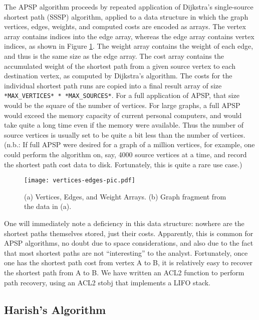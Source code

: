 \documentclass[copyright]{eptcs}
\begin{document}
The APSP algorithm proceeds by repeated application of Dijkstra's
single-source shortest path (SSSP) algorithm, applied to a data structure in
which the graph vertices, edges, weights, and computed costs are
encoded as arrays.  The vertex array contains indices into the edge
array, whereas the edge array contains vertex indices, as shown in
Figure \ref{vertices-edges-pic}.  The weight array contains the weight
of each edge, and thus is the same size as the edge array.  The cost
array contains the accumulated weight of the shortest path from a
given source vertex to each destination vertex, as computed by
Dijkstra's algorithm.  The costs for the individual shortest path runs
are copied into a final result array of size \texttt{*MAX\_VERTICES* *
  *MAX\_SOURCES*}.  For a full application of APSP, that size would be
the square of the number of vertices.  For large graphs, a full APSP would
exceed the memory capacity of current personal computers, and would take 
quite a long time even if the memory were available.  Thus the 
number of source vertices is usually set to be quite a bit less than the
number of vertices.   (n.b.: If full APSP were desired for a graph of
a million vertices, for example, one could perform the algorithm on,
say, 4000 source vertices at a time, and record the shortest path cost 
data to disk.  Fortunately, this is quite a rare use case.)

\begin{figure}
\begin{center}
\texttt{[image: vertices-edges-pic.pdf]}
\end{center}
\caption{(a) Vertices, Edges, and Weight Arrays.  (b) Graph fragment
  from the data in (a).}
\label{vertices-edges-pic}
\end{figure}

One will immediately note a deficiency in this data structure: nowhere
are the shortest paths themselves stored, just their costs.
Apparently, this is common for APSP algorithms, no doubt due to space 
considerations, and also due to the fact that most shortest paths are
not ``interesting'' to the analyst.  Fortunately, once one has the shortest
path cost from vertex A to B, it is relatively easy to recover the shortest
path from A to B.  We have written an ACL2 function to perform path
recovery, using an ACL2 stobj that implements a LIFO stack.

\subsection{Harish's Algorithm}
\end{document}

